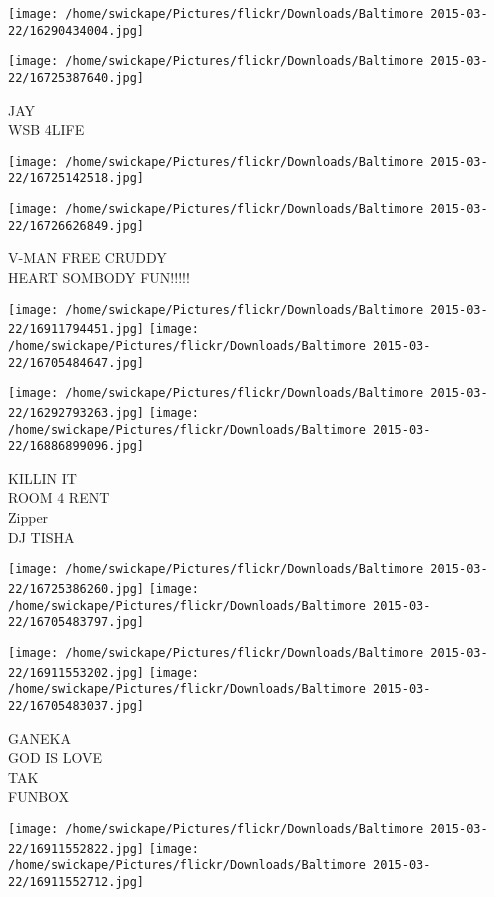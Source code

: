 \documentclass[10pt,letterpaper]{article}
\begin{document}
\texttt{[image: /home/swickape/Pictures/flickr/Downloads/Baltimore 2015-03-22/16290434004.jpg]}

\vspace{0.25in}
\texttt{[image: /home/swickape/Pictures/flickr/Downloads/Baltimore 2015-03-22/16725387640.jpg]}

JAY\\
WSB 4LIFE
\pagebreak

\texttt{[image: /home/swickape/Pictures/flickr/Downloads/Baltimore 2015-03-22/16725142518.jpg]}

\vspace{0.25in}
\texttt{[image: /home/swickape/Pictures/flickr/Downloads/Baltimore 2015-03-22/16726626849.jpg]}

V{-}MAN FREE CRUDDY\\
HEART SOMBODY FUN!!!!!
\pagebreak

\texttt{[image: /home/swickape/Pictures/flickr/Downloads/Baltimore 2015-03-22/16911794451.jpg]}
\texttt{[image: /home/swickape/Pictures/flickr/Downloads/Baltimore 2015-03-22/16705484647.jpg]}

\texttt{[image: /home/swickape/Pictures/flickr/Downloads/Baltimore 2015-03-22/16292793263.jpg]}
\texttt{[image: /home/swickape/Pictures/flickr/Downloads/Baltimore 2015-03-22/16886899096.jpg]}

KILLIN IT\\
ROOM 4 RENT\\
Zipper\\
DJ TISHA
\pagebreak

\texttt{[image: /home/swickape/Pictures/flickr/Downloads/Baltimore 2015-03-22/16725386260.jpg]}
\texttt{[image: /home/swickape/Pictures/flickr/Downloads/Baltimore 2015-03-22/16705483797.jpg]}

\texttt{[image: /home/swickape/Pictures/flickr/Downloads/Baltimore 2015-03-22/16911553202.jpg]}
\texttt{[image: /home/swickape/Pictures/flickr/Downloads/Baltimore 2015-03-22/16705483037.jpg]}

GANEKA\\
GOD IS LOVE\\
TAK\\
FUNBOX
\pagebreak

\texttt{[image: /home/swickape/Pictures/flickr/Downloads/Baltimore 2015-03-22/16911552822.jpg]}
\texttt{[image: /home/swickape/Pictures/flickr/Downloads/Baltimore 2015-03-22/16911552712.jpg]}
\end{document}

